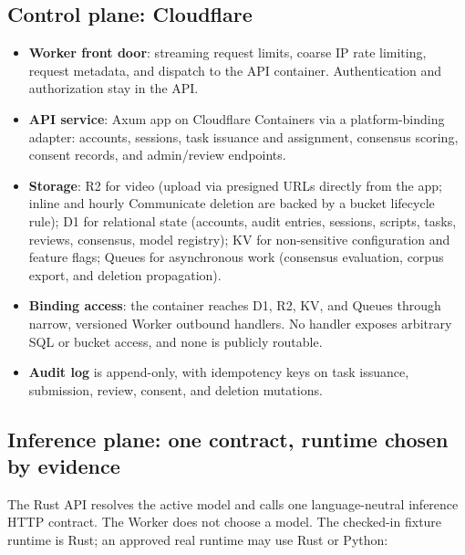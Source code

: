 \documentclass[11pt]{article}
\begin{document}
\subsection{Control plane: Cloudflare}

\begin{itemize}[nosep]
  \item \textbf{Worker front door}: streaming request limits, coarse IP rate
        limiting, request metadata, and dispatch to the API container. Authentication
        and authorization stay in the API.
  \item \textbf{API service}: Axum app on Cloudflare Containers via
        a platform-binding adapter: accounts, sessions, task issuance and
        assignment, consensus scoring, consent records, and admin/review endpoints.
  \item \textbf{Storage}: R2 for video (upload via presigned URLs directly from
        the app; inline and hourly Communicate deletion are backed by a bucket
        lifecycle rule); D1 for relational state (accounts, audit
        entries, sessions, scripts, tasks, reviews, consensus, model registry); KV for
        non-sensitive configuration and feature flags; Queues for
        asynchronous work (consensus evaluation, corpus export, and deletion
        propagation).
  \item \textbf{Binding access}: the container reaches D1, R2, KV, and Queues
        through narrow, versioned Worker outbound handlers. No handler exposes
        arbitrary SQL or bucket access, and none is publicly routable.
  \item \textbf{Audit log} is append-only, with idempotency keys on task issuance,
        submission, review, consent, and deletion mutations.
\end{itemize}

\subsection{Inference plane: one contract, runtime chosen by evidence}

The Rust API resolves the active model and calls one language-neutral inference HTTP
contract. The Worker does not choose a model. The checked-in fixture runtime is Rust;
an approved real runtime may use Rust or Python:
\end{document}
